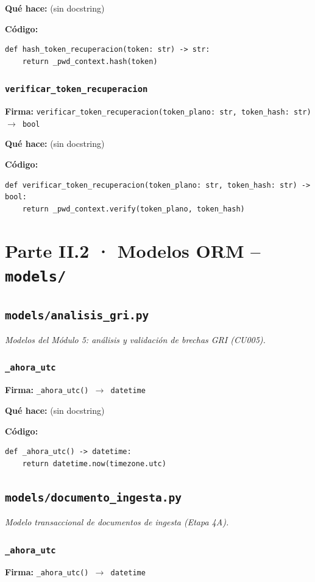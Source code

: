 \documentclass[11pt,a4paper]{article}
\begin{document}
\textbf{Qué hace:} (sin docstring)

\textbf{Código:}
\begin{lstlisting}
def hash_token_recuperacion(token: str) -> str:
    return _pwd_context.hash(token)
\end{lstlisting}

\subsubsection*{\texttt{verificar\_token\_recuperacion}}
\textbf{Firma:} \texttt{verificar\_token\_recuperacion(token\_plano: str, token\_hash: str) $\rightarrow$ bool}

\textbf{Qué hace:} (sin docstring)

\textbf{Código:}
\begin{lstlisting}
def verificar_token_recuperacion(token_plano: str, token_hash: str) -> bool:
    return _pwd_context.verify(token_plano, token_hash)
\end{lstlisting}

\section{Parte II.2 · Modelos ORM -- \texttt{models/}}
\subsection{\texttt{models/analisis\_gri.py}}
\textit{Modelos del Módulo 5: análisis y validación de brechas GRI (CU005).}

\subsubsection*{\texttt{\_ahora\_utc}}
\textbf{Firma:} \texttt{\_ahora\_utc() $\rightarrow$ datetime}

\textbf{Qué hace:} (sin docstring)

\textbf{Código:}
\begin{lstlisting}
def _ahora_utc() -> datetime:
    return datetime.now(timezone.utc)
\end{lstlisting}

\subsection{\texttt{models/documento\_ingesta.py}}
\textit{Modelo transaccional de documentos de ingesta (Etapa 4A).}

\subsubsection*{\texttt{\_ahora\_utc}}
\textbf{Firma:} \texttt{\_ahora\_utc() $\rightarrow$ datetime}
\end{document}
